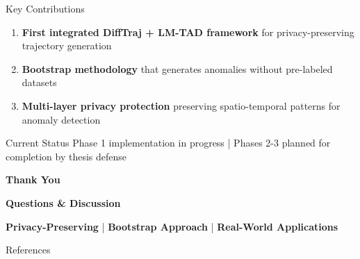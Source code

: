 \documentclass[aspectratio=169,xcolor={dvipsnames}]{beamer}
\begin{document}
\begin{frame}{Key Contributions}
  \begin{block}{}
    \begin{enumerate}
      \item \textbf{First integrated DiffTraj + LM-TAD framework} for privacy-preserving trajectory generation
      \item \textbf{Bootstrap methodology} that generates anomalies without pre-labeled datasets
      \item \textbf{Multi-layer privacy protection} preserving spatio-temporal patterns for anomaly detection
    \end{enumerate}
  \end{block}
  
  \vspace{1em}
  \begin{alertblock}{Current Status}
    \centering
    Phase 1 implementation in progress | Phases 2-3 planned for completion by thesis defense
  \end{alertblock}
\end{frame}

\begin{frame}[plain]
  \centering
  \Huge \textbf{Thank You}
  
  \vspace{0.5em}
  \Large \textbf{Questions \& Discussion}
  
  \vspace{2em}
  \begin{block}{}
    \centering
    \textbf{Privacy-Preserving} | \textbf{Bootstrap Approach} | \textbf{Real-World Applications}
  \end{block}
\end{frame}

\begin{frame}[allowframebreaks]{References}
  \footnotesize
  \printbibliography[heading=none]
\end{frame}
\end{document}
